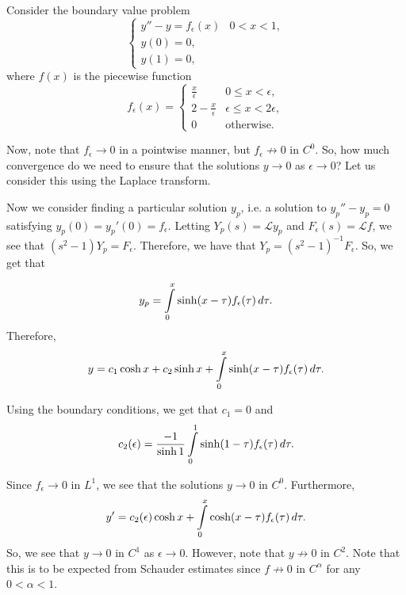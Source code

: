\begin{example}
Consider the boundary value problem
\begin{equation}
\begin{cases}
y'' - y = f_\epsilon(x) & 0<x<1,\\
y(0) = 0,\\
y(1) = 0,
\end{cases}
\end{equation}
where $f(x)$ is the piecewise function
\begin{equation}
f_\epsilon(x) = 
\begin{cases}
\frac{x}{\epsilon} & 0 \leq x < \epsilon,\\
2 - \frac{x}{\epsilon} & \epsilon \leq x < 2\epsilon,\\
0 & \text{otherwise}.
\end{cases}
\end{equation}

Now, note that $f_\epsilon \to 0$ in a pointwise manner, but $f_\epsilon \not \to 0$ in $C^0$. So, how much convergence do we need to ensure that the solutions $y \to 0$ as $\epsilon \to 0$? Let us consider this using the Laplace transform.

Now we consider finding a particular solution $y_p$, i.e. a solution to $y_p'' - y_p=0$ satisfying $y_p(0) = y_p'(0) = f_\epsilon$. Letting $Y_p(s) = \mathcal L y_p$ and $F_\epsilon(s) = \mathcal L f$, we see that $(s^2 - 1)Y_p = F_\epsilon.$ Therefore, we have that $Y_p = (s^2 - 1)^{-1} F_\epsilon$. So, we get that

\begin{equation}
y_p = \int\limits_0^x \sinh(x - \tau) f_\epsilon(\tau) \, d\tau.
\end{equation}
Therefore,
\begin{equation}
y = c_1 \cosh x + c_2 \sinh x + \int\limits_0^x \sinh(x-\tau)f_\epsilon(\tau) \, d\tau.
\end{equation}

Using the boundary conditions, we get that $c_1 = 0$ and
\begin{equation}
c_2 (\epsilon) = \frac{-1}{\sinh 1} \int\limits_0^1 \sinh(1-\tau)f_\epsilon(\tau)\, d\tau.
\end{equation}

Since $f_\epsilon \to 0$ in $L^1$, we see that the solutions $y\to 0$ in $C^0$. Furthermore,
\begin{equation}
y' = c_2(\epsilon)\cosh x  + \int\limits_0^x \cosh(x-\tau)f_\epsilon(\tau) \, d\tau.
\end{equation}
So, we see that $y \to 0$ in $C^1$ as $\epsilon \to 0$. However, note that $y \not \to 0$ in $C^2$. Note that this is to be expected from Schauder estimates since $f\not \to 0$ in $C^\alpha$ for any $0<\alpha<1$.

\end{example}

